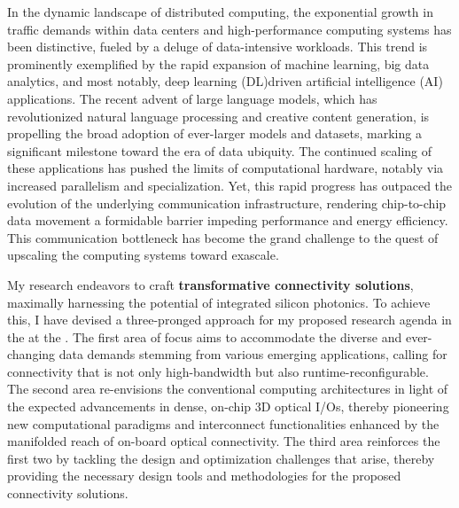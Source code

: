 In the dynamic landscape of distributed computing, the exponential growth in traffic demands within data centers and high-performance computing systems has been distinctive, fueled by a deluge of data-intensive workloads. This trend is prominently exemplified by the rapid expansion of machine learning, big data analytics, and most notably, deep learning (DL)\textendash driven artificial intelligence (AI) applications. The recent advent of large language models, which has revolutionized natural language processing and creative content generation, is propelling the broad adoption of ever-larger models and datasets, marking a significant milestone toward the era of data ubiquity. The continued scaling of these applications has pushed the limits of computational hardware, notably via increased parallelism and specialization. Yet, this rapid progress has outpaced the evolution of the underlying communication infrastructure, rendering chip-to-chip data movement a formidable barrier impeding performance and energy efficiency. This communication bottleneck has become the grand challenge to the quest of upscaling the computing systems toward exascale.

My research endeavors to craft \textbf{transformative connectivity solutions}, maximally harnessing the potential of integrated silicon photonics. To achieve this, I have devised a three-pronged approach for my proposed research agenda in the \appDept{} at the \appSchool{}. The first area of focus aims to accommodate the diverse and ever-changing data demands stemming from various emerging applications, calling for connectivity that is not only high-bandwidth but also runtime-reconfigurable. The second area re-envisions the conventional computing architectures in light of the expected advancements in dense, on-chip 3D optical I/Os, thereby pioneering new computational paradigms and interconnect functionalities enhanced by the manifolded reach of on-board optical connectivity. The third area reinforces the first two by tackling the design and optimization challenges that arise, thereby providing the necessary design tools and methodologies for the proposed connectivity solutions.

